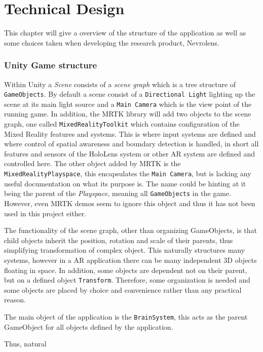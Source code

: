 \chapter{Technical Design}

This chapter will give a overview of the structure of the application as well as some choices taken when developing the research product, Nevrolens. 

\subsection*{Unity Game structure}

Within Unity a \textit{Scene} consists of a \textit{scene graph} which is a tree structure of \texttt{GameObjects}. By default a scene consist of a \texttt{Directional Light} lighting up the scene at its main light source and a \texttt{Main Camera} which is the view point of the running game. In addition, the MRTK library will add two objects to the scene graph, one called \texttt{MixedRealityToolkit} which contains configuration of the Mixed Reality features and systems. This is where input systems are defined and where control of spatial awareness and boundary detection is handled, in short all features and sensors of the HoloLens system or other AR system are defined and controlled here. The other object added by MRTK is the \texttt{MixedRealityPlayspace}, this encapsulates the \texttt{Main Camera}, but is lacking any useful documentation on what its purpose is. The name could be hinting at it being the parent of the \textit{Playspace}, meaning all \texttt{GameObjects} in the game. However, even MRTK demos seem to ignore this object and thus it has not been used in this project either.

The functionality of the scene graph, other than organizing GameObjects, is that child objects inherit the position, rotation and scale of their parents, thus simplifying transformation of complex object. This naturally structures many systems, however in a AR application there can be many independent 3D objects floating in space. In addition, some objects are dependent not on their parent, but on a defined object \texttt{Transform}. Therefore, some organization is needed and some objects are placed by choice and convenience rather than any practical reason.

The main object of the application is the \texttt{BrainSystem}, this acts as the parent GameObject for all objects defined by the application. 

Thus, natural


